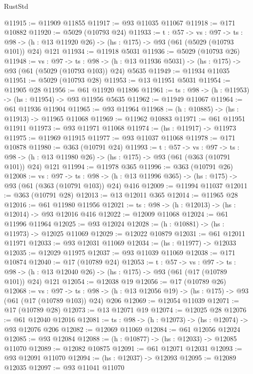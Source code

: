 \begin{lexlean}{RustStd}
\begin{coremodule}
@11915 := @11909 @11855
@11917 := @93 @11035 @11067
@11918 := @171 @10882
@11920 := @5029 (@10793 @24)
@11933 := {t : @57} ->
  {vs : @97} ->
  {ts : @98} -> (h : @13 @11920 @26) -> (hs : @175) -> @93 (@61 (@5029 (@10793 @101)) @24) @121
@11934 := @11918 @5031
@11936 := @5029 (@10793 @26)
@11948 := {vs : @97} ->
  {ts : @98} -> (h : @13 @11936 @5031) -> (hs : @175) -> @93 (@61 (@5029 (@10793 @103)) @24) @5635
@11949 := @11934 @11035
@11951 := @5029 (@10793 @28)
@11953 := @13 @11951 @5031
@11954 := @11905 @28
@11956 := @61 @11920 @11896
@11961 := {ts : @98} -> (h : @11953) -> (hs : @11954) -> @93 @11956 @5635
@11962 := @11949 @11067
@11964 := @61 @11936 @11904
@11965 := @93 @11964
@11968 := (h : @10885) -> (hs : @11913) -> @11965 @11068
@11969 := @11962 @10883
@11971 := @61 @11951 @11911
@11973 := @93 @11971 @11068
@11974 := (hs : @11917) -> @11973
@11975 := @11969 @11915
@11977 := @93 @11037 @11068
@11978 := @171 @10878
@11980 := @363 (@10791 @24)
@11993 := {t : @57} ->
  {vs : @97} ->
  {ts : @98} -> (h : @13 @11980 @26) -> (hs : @175) -> @93 (@61 (@363 (@10791 @101)) @24) @121
@11994 := @11978 @365
@11996 := @363 (@10791 @26)
@12008 := {vs : @97} ->
  {ts : @98} -> (h : @13 @11996 @365) -> (hs : @175) -> @93 (@61 (@363 (@10791 @103)) @24) @416
@12009 := @11994 @11037
@12011 := @363 (@10791 @28)
@12013 := @13 @12011 @365
@12014 := @11965 @28
@12016 := @61 @11980 @11956
@12021 := {ts : @98} -> (h : @12013) -> (hs : @12014) -> @93 @12016 @416
@12022 := @12009 @11068
@12024 := @61 @11996 @11964
@12025 := @93 @12024
@12028 := (h : @10881) -> (hs : @11973) -> @12025 @11069
@12029 := @12022 @10879
@12031 := @61 @12011 @11971
@12033 := @93 @12031 @11069
@12034 := (hs : @11977) -> @12033
@12035 := @12029 @11975
@12037 := @93 @11039 @11069
@12038 := @171 @10874
@12040 := @17 (@10789 @24)
@12053 := {t : @57} ->
  {vs : @97} ->
  {ts : @98} -> (h : @13 @12040 @26) -> (hs : @175) -> @93 (@61 (@17 (@10789 @101)) @24) @121
@12054 := @12038 @19
@12056 := @17 (@10789 @26)
@12068 := {vs : @97} ->
  {ts : @98} -> (h : @13 @12056 @19) -> (hs : @175) -> @93 (@61 (@17 (@10789 @103)) @24) @206
@12069 := @12054 @11039
@12071 := @17 (@10789 @28)
@12073 := @13 @12071 @19
@12074 := @12025 @28
@12076 := @61 @12040 @12016
@12081 := {ts : @98} -> (h : @12073) -> (hs : @12074) -> @93 @12076 @206
@12082 := @12069 @11069
@12084 := @61 @12056 @12024
@12085 := @93 @12084
@12088 := (h : @10877) -> (hs : @12033) -> @12085 @11070
@12089 := @12082 @10875
@12091 := @61 @12071 @12031
@12093 := @93 @12091 @11070
@12094 := (hs : @12037) -> @12093
@12095 := @12089 @12035
@12097 := @93 @11041 @11070

\end{coremodule}
\end{lexlean}
